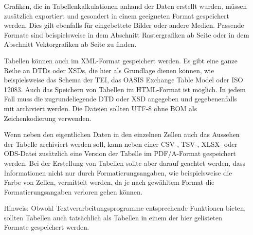 Grafiken, die in Tabellenkalkulationen anhand der Daten erstellt wurden, müssen zusätzlich exportiert und gesondert in einem geeigneten Format gespeichert werden. Dies gilt ebenfalls für eingebettete Bilder oder andere Medien. Passende Formate sind beispielsweise in dem Abschnitt Rastergrafiken ab Seite \pageref{rastergrafiken} oder in dem Abschnitt Vektorgrafiken ab Seite \pageref{vektorgrafiken} zu finden.

Tabellen können auch im XML-Format gespeichert werden. Es gibt eine ganze Reihe an DTDs oder XSDs, die hier als Grundlage dienen können, wie beispielsweise das Schema der TEI, das OASIS Exchange Table Model oder ISO 12083. Auch das Speichern von Tabellen im HTML-Format ist möglich. In jedem Fall muss die zugrundeliegende DTD oder XSD angegeben und gegebenenfalls mit archiviert werden. Die Dateien sollten UTF-8 ohne BOM als Zeichenkodierung verwenden.

Wenn neben den eigentlichen Daten in den einzelnen Zellen auch das Aussehen der Tabelle archiviert werden soll, kann neben einer CSV-, TSV-, XLSX- oder ODS-Datei zusätzlich eine Version der Tabelle im PDF/A-Format gespeichert werden. Bei der Erstellung von Tabellen sollte aber darauf geachtet werden, dass Informationen nicht nur durch Formatierungsangaben, wie beispielsweise die Farbe von Zellen, vermittelt werden, da je nach gewähltem Format die Formatierungsangaben verloren gehen können.

Hinweis: Obwohl Textverarbeitungsprogramme entsprechende Funktionen bieten, sollten Tabellen auch tatsächlich als Tabellen in einem der hier gelisteten Formate gespeichert werden.

